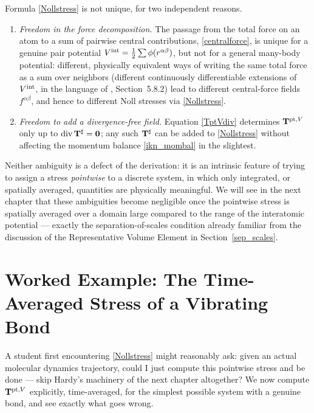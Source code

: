 \begin{remark}\label{rem:nonuniqueness}
	Formula \eqref{Nollstress} is not unique, for two independent reasons.
	\begin{enumerate}
		\item \textit{Freedom in the force decomposition.} The passage from the total force on an atom to a sum of pairwise central contributions, \eqref{centralforce}, is unique for a genuine pair potential $V^{\rm int}=\frac12\sum\phi(r^{\alpha\beta})$, but not for a general many-body potential: different, physically equivalent ways of writing the same total force as a sum over neighbors (different continuously differentiable extensions of $V^{\rm int}$, in the language of \cite{TadmorMiller}, Section~5.8.2) lead to different central-force fields $f^{\alpha\beta}$, and hence to different Noll stresses via \eqref{Nollstress}.
		\item \textit{Freedom to add a divergence-free field.} Equation \eqref{TptVdiv} determines $\mathbf{T}^{{\rm pt},V}$ only up to $\operatorname{div}\mathbf{T}^\sharp=\mathbf0$; any such $\mathbf{T}^\sharp$ can be added to \eqref{Nollstress} without affecting the momentum balance \eqref{ikn_mombal} in the slightest.
	\end{enumerate}
	Neither ambiguity is a defect of the derivation: it is an intrinsic feature of trying to assign a stress \textit{pointwise} to a discrete system, in which only integrated, or spatially averaged, quantities are physically meaningful. We will see in the next chapter that these ambiguities become negligible once the pointwise stress is spatially averaged over a domain large compared to the range of the interatomic potential --- exactly the separation-of-scales condition already familiar from the discussion of the Representative Volume Element in Section~\ref{sep_scales}.
\end{remark}

\section{Worked Example: The Time-Averaged Stress of a Vibrating Bond}\label{sec:diatomic}

A student first encountering \eqref{Nollstress} might reasonably ask: given an actual molecular dynamics trajectory, could I just compute this pointwise stress and be done --- skip Hardy's machinery of the next chapter altogether? We now compute $\mathbf{T}^{{\rm pt},V}$ explicitly, time-averaged, for the simplest possible system with a genuine bond, and see exactly what goes wrong.

